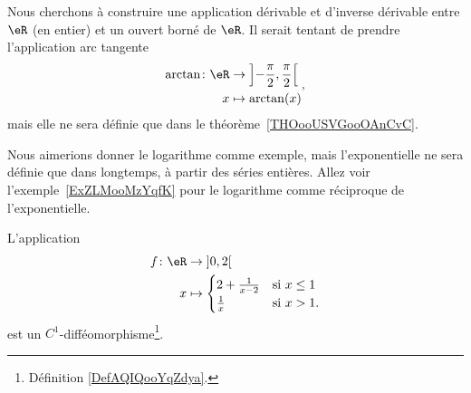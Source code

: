 Nous cherchons à construire une application dérivable et d'inverse dérivable entre \( \eR\) (en entier) et un ouvert borné de \( \eR\). Il serait tentant de prendre l'application arc tangente
\begin{equation}
	\begin{aligned}
		\arctan\colon \eR & \to \left] -\frac{ \pi }{2} , \frac{ \pi }{2} \right[ \\
		x                 & \mapsto \arctan(x)
	\end{aligned},
\end{equation}
mais elle ne sera définie que dans le théorème~\ref{THOooUSVGooOAnCvC}.

Nous aimerions donner le logarithme comme exemple, mais l'exponentielle ne sera définie que dans longtemps, à partir des séries entières. Allez voir l'exemple~\ref{ExZLMooMzYqfK} pour le logarithme comme réciproque de l'exponentielle.

\begin{proposition}	\label{PROPooKPACooElwCbh}
	L'application
	\begin{equation}   \label{EQooOSPIooNWZBCa}
		\begin{aligned}
			f\colon \eR & \to \mathopen] 0,2\mathclose[ \\
			x           & \mapsto
			\begin{cases}
				2+\frac{1}{ x-2 } & \text{si } x\leq 1 \\
				\frac{1}{ x }     & \text{si } x>1.
			\end{cases}
		\end{aligned}
	\end{equation}
	est un \( C^1\)-difféomorphisme\footnote{Définition \ref{DefAQIQooYqZdya}.}.
\end{proposition}

\begin{center}
	
\end{center}

